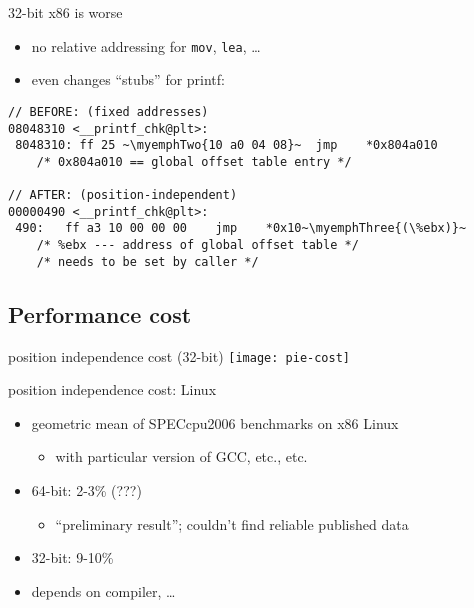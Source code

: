 \begin{frame}[fragile,label=x86Worse]{32-bit x86 is worse}
    \begin{itemize}
    \item no relative addressing for {\tt mov}, {\tt lea}, \ldots
    \item even changes ``stubs'' for printf:
    \end{itemize}
\lstset{
    language=myasm,
    style=smaller,
    escapeinside=~~,
}
\begin{lstlisting}
// BEFORE: (fixed addresses)
08048310 <__printf_chk@plt>:
 8048310: ff 25 ~\myemphTwo{10 a0 04 08}~  jmp    *0x804a010
    /* 0x804a010 == global offset table entry */

// AFTER: (position-independent)
00000490 <__printf_chk@plt>:
 490:	ff a3 10 00 00 00    jmp    *0x10~\myemphThree{(\%ebx)}~
    /* %ebx --- address of global offset table */
    /* needs to be set by caller */
\end{lstlisting}
\end{frame}

\subsection{Performance cost}

\begin{frame}{position independence cost (32-bit)}
\texttt{[image: pie-cost]}
\end{frame}

\begin{frame}{position independence cost: Linux}
\begin{itemize}
    \item geometric mean of SPECcpu2006 benchmarks on x86 Linux
        \begin{itemize}
            \item with particular version of GCC, etc., etc.
        \end{itemize}
    \item 64-bit: 2-3\% (???)
        \begin{itemize}
        \item ``preliminary result''; couldn't find reliable published data
        \end{itemize}
    \item 32-bit: 9-10\%
    \item depends on compiler, \ldots
\end{itemize}
\end{frame}


